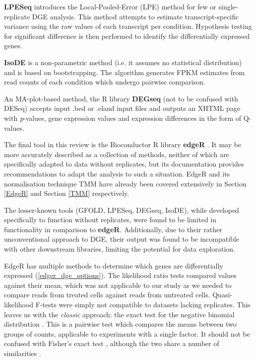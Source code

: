 \textbf{LPESeq} \citep{gim2016lpeseq} introduces the Local-Pooled-Error (LPE) method for few or single-replicate \ac{DGE} analysis. This method attempts to estimate transcript-specific variance using the raw values of each transcript per condition. Hypothesis testing for significant difference is then performed to identify the differentially expressed genes.

\textbf{IsoDE} \citep{al2014bootstrap} is a non-parametric method (i.e. it assumes no statistical distribution) and is based on bootstrapping. The algorithm generates FPKM estimates from read counts of each condition which undergo pairwise comparison.

An MA-plot-based method, the R library \textbf{DEGseq} \citep{wang2010degseq} (not to be confused with DESeq) accepts input .bed or .eland input files and outputs an XHTML page with \textit{p}-values, gene expression values and expression differences in the form of Q-values.

The final tool in this review is the Bioconductor R library \textbf{edgeR} \citep{edger}. It may be more accurately described as a collection of methods, neither of which are specifically adapted to data without replicates, but its documentation provides recommendations to adapt the analysis to such a situation. EdgeR and its normalisation technique TMM have already been covered extensively in Section \ref{EdgeR} and Section \ref{TMM} respectively. 

The lesser-known tools (GFOLD, LPESeq, DEGseq, IsoDE), while developed specifically to function without replicates, were found to be limited in functionality in comparison to \textbf{edgeR}. Additionally, due to their rather unconventional approach to \ac{DGE}, their output was found to be incompatible with other downstream libraries, limiting the potential for data exploration. 

EdgeR has multiple methods to determine which genes are differentially expressed (\autoref{edger_dge_options}). The likelihood ratio tests \citep{mccarthy2012differential} compared values against their mean, which was not applicable to our study as we needed to compare reads from treated cells against reads from untreated cells. Quasi-likelihood F-tests \citep{lun2016s, lund2012detecting} were simply not compatible to datasets lacking replicates. This leaves us with the \textit{classic} approach: the exact test for the negative binomial distribution \citep{robinson2007moderated, robinson2008small}. This is a pairwise test which compares the means between two groups of counts, applicable to experiments with a single factor. It should not be confused with Fisher's exact test \citep{fisher1922interpretation}, although the two share a number of similarities \citep{chen2014edger}. 

